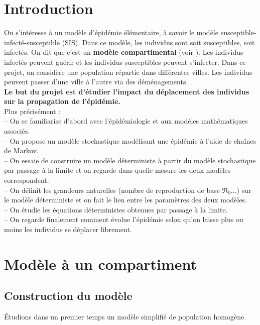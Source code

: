 \documentclass[a4paper,10.9pt]{article}
\newcommand{\R}{\mathfrak{R}_0}
\begin{document}
\section{Introduction}
On s'intéresse à un modèle d'épidémie élémentaire, à savoir le modèle susceptible-infecté-susceptible (SIS). Dans ce modèle, les individus sont soit susceptibles, soit infectés. On dit que c'est un \textbf{modèle compartimental} (voir \cite{CompartmentalModels}). Les individus infectés peuvent guérir et les individus susceptibles peuvent s'infecter. Dans ce projet, on considère une population répartie dans différentes villes. Les individus peuvent passer d'une ville à l'autre via des déménagements.\\

\textbf{Le but du projet est d'étudier l'impact du
déplacement des individus sur la propagation de l'épidémie.} \\

Plus précisément : \\
-- On se familiarise d'abord avec l'épidémiologie et aux modèles mathématiques associés. \\
-- On propose un modèle stochastique modélisant une épidémie à l'aide de chaînes de Markov. \\
-- On essaie de construire un modèle déterministe à partir du modèle stochastique par passage à la limite et on regarde dans quelle mesure les deux modèles correspondent.  \\
-- On définit les grandeurs naturelles (nombre de reproduction de base $\R$...) sur le modèle déterministe et on fait le lien entre les paramètres des deux modèles. \\
-- On étudie les équations déterministes obtenues par passage à la limite. \\
-- On regarde finalement comment évolue l'épidémie selon qu'on laisse plus ou moins les individus se déplacer librement.

\newpage

\section{Modèle à un compartiment}

\subsection{Construction du modèle}
Étudions dans un premier temps un modèle simplifié de population homogène. \\
\end{document}
